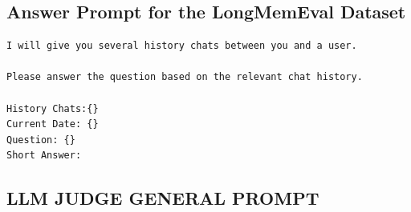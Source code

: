 \subsection{Answer Prompt for the LongMemEval Dataset}



\begin{center}
\begin{tcolorbox}[title={Answer Prompt for the LongMemEval Dataset}]
{
\begin{Verbatim}[breaklines, breakanywhere, fontsize=\small,
                 fontfamily=tt, fontseries=b]
I will give you several history chats between you and a user.

Please answer the question based on the relevant chat history.

History Chats:{}
Current Date: {}
Question: {}
Short Answer:
\end{Verbatim}
}
\label{appendix:case_1}
\end{tcolorbox}
\end{center}

\FloatBarrier
\subsection{LLM JUDGE GENERAL PROMPT}


